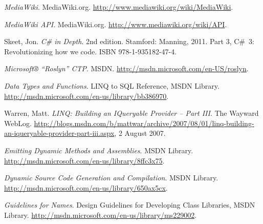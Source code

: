 
\def\bibname{Bibliography}
\begin{thebibliography}{9}
\addcontentsline{toc}{chapter}{\bibname}


 \emph{MediaWiki}.
 MediaWiki.org.
 \url{http://www.mediawiki.org/wiki/MediaWiki}.

 \emph{MediaWiki API}.
 MediaWiki.org.
 \url{http://www.mediawiki.org/wiki/API}.
 
  {\sc Skeet,} Jon.
  \emph{C\# in Depth}.
  2nd edition.
  Stamford: Manning, 2011.
  Part 3, C\#~3: Revolutionizing how we code.
  ISBN 978-1-935182-47-4.
  
 \emph{Microsoft® “Roslyn” CTP}.
 MSDN.
 \url{http://msdn.microsoft.com/en-US/roslyn}.
 
 \emph{Data Types and Functions}.
 LINQ to SQL Reference, MSDN Library.
 \url{http://msdn.microsoft.com/en-us/library/bb386970}.

 {\sc Warren}, Matt.
 \emph{LINQ: Building an IQueryable Provider -- Part III}.
 The Wayward WebLog.
 \url{http://blogs.msdn.com/b/mattwar/archive/2007/08/01/linq-building-an-iqueryable-provider-part-iii.aspx},
 2 August 2007.
 
 \emph{Emitting Dynamic Methods and Assemblies}.
 MSDN Library.
 \url{http://msdn.microsoft.com/en-us/library/8ffc3x75}.

 \emph{Dynamic Source Code Generation and Compilation}.
 MSDN Library.
 \url{http://msdn.microsoft.com/en-us/library/650ax5cx}.
 
 \emph{Guidelines for Names}.
 Design Guidelines for Developing Class Libraries, MSDN Library.
 \url{http://msdn.microsoft.com/en-us/library/ms229002}.
 
\end{thebibliography}